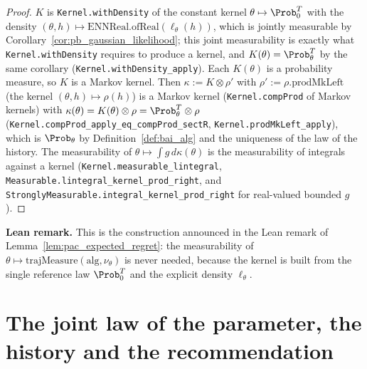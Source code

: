 \begin{proof}
\leanok
{}
$K$ is \texttt{Kernel.withDensity} of the constant kernel $\theta\mapsto\Prob_0^T$ with the
density $(\theta,h)\mapsto\mathrm{ENNReal.ofReal}(\ell_\theta(h))$, which is jointly measurable
by Corollary~\ref{cor:pb_gaussian_likelihood}; this joint measurability is exactly what
\texttt{Kernel.withDensity} requires to produce a kernel, and $K(\theta) = \Prob_\theta^T$ by
the same corollary (\texttt{Kernel.withDensity\_apply}). Each $K(\theta)$ is a probability
measure, so $K$ is a Markov kernel. Then $\kappa := K\otimes\rho'$ with
$\rho' := \rho.\mathrm{prodMkLeft}$ (the kernel $(\theta,h)\mapsto\rho(h)$) is a Markov kernel
(\texttt{Kernel.compProd} of Markov kernels) with
$\kappa(\theta) = K(\theta)\otimes\rho = \Prob_\theta^T\otimes\rho$
(\texttt{Kernel.compProd\_apply\_eq\_compProd\_sectR}, \texttt{Kernel.prodMkLeft\_apply}),
which is $\Prob_\theta$ by Definition~\ref{def:bai_alg} and the uniqueness of the law of the
history. The measurability of $\theta\mapsto\int g\,d\kappa(\theta)$ is the measurability of
integrals against a kernel (\texttt{Kernel.measurable\_lintegral},
\texttt{Measurable.lintegral\_kernel\_prod\_right}, and
\texttt{StronglyMeasurable.integral\_kernel\_prod\_right} for real-valued bounded $g$).
\end{proof}

\textbf{Lean remark.} This is the construction announced in the Lean remark of
Lemma~\ref{lem:pac_expected_regret}: the measurability of
$\theta\mapsto\mathrm{trajMeasure}(\mathrm{alg},\nu_\theta)$ is never needed, because the kernel
is built from the single reference law $\Prob_0^T$ and the explicit density $\ell_\theta$.

\section{The joint law of the parameter, the history and the recommendation}
\label{sec:pre_bayes_joint}


